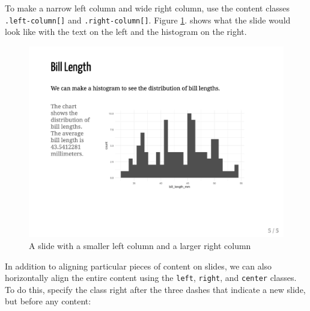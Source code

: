 \documentclass[
]{book}
\begin{document}
To make a narrow left column and wide right column, use the content classes \texttt{.left-column{[}{]}} and \texttt{.right-column{[}{]}}. Figure \ref{fig:slide-two-columns-v2}. shows what the slide would look like with the text on the left and the histogram on the right.

\begin{figure}
\includegraphics[width=1\linewidth]{assets/slide-two-columns-v2} \caption{A slide with a smaller left column and a larger right column}\label{fig:slide-two-columns-v2}
\end{figure}

In addition to aligning particular pieces of content on slides, we can also horizontally align the entire content using the \texttt{left}, \texttt{right}, and \texttt{center} classes. To do this, specify the class right after the three dashes that indicate a new slide, but before any content:
\end{document}
